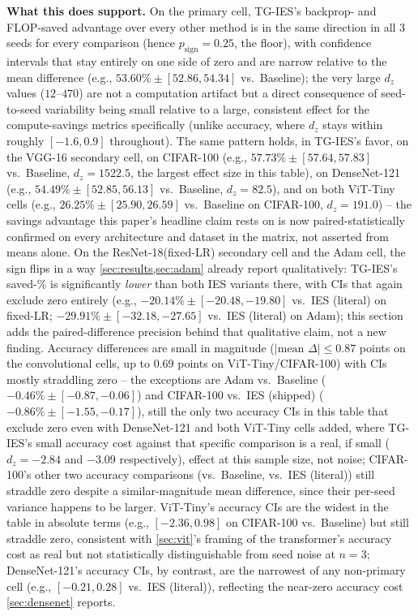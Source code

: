 \documentclass{article}
\theoremstyle{plain}
\theoremstyle{definition}
\theoremstyle{remark}
\begin{document}
\textbf{What this does support.} On the primary cell, TG-IES's backprop- and FLOP-saved advantage over every other method is in the same direction in all 3 seeds for every comparison (hence $p_{\mathrm{sign}}=0.25$, the floor), with confidence intervals that stay entirely on one side of zero and are narrow relative to the mean difference (e.g., $53.60\%\pm[52.86,54.34]$ vs.\ Baseline); the very large $d_z$ values ($12$--$470$) are not a computation artifact but a direct consequence of seed-to-seed variability being small relative to a large, consistent effect for the compute-savings metrics specifically (unlike accuracy, where $d_z$ stays within roughly $[-1.6,0.9]$ throughout). The same pattern holds, in TG-IES's favor, on the VGG-16 secondary cell, on CIFAR-100 (e.g., $57.73\%\pm[57.64,57.83]$ vs.\ Baseline, $d_z=1522.5$, the largest effect size in this table), on DenseNet-121 (e.g., $54.49\%\pm[52.85,56.13]$ vs.\ Baseline, $d_z=82.5$), and on both ViT-Tiny cells (e.g., $26.25\%\pm[25.90,26.59]$ vs.\ Baseline on CIFAR-100, $d_z=191.0$) -- the savings advantage this paper's headline claim rests on is now paired-statistically confirmed on every architecture and dataset in the matrix, not asserted from means alone. On the ResNet-18(fixed-LR) secondary cell and the Adam cell, the sign flips in a way \cref{sec:results,sec:adam} already report qualitatively: TG-IES's saved-\% is significantly \emph{lower} than both IES variants there, with CIs that again exclude zero entirely (e.g., $-20.14\%\pm[-20.48,-19.80]$ vs.\ IES (literal) on fixed-LR; $-29.91\%\pm[-32.18,-27.65]$ vs.\ IES (literal) on Adam); this section adds the paired-difference precision behind that qualitative claim, not a new finding. Accuracy differences are small in magnitude ($|\text{mean }\Delta|\le0.87$ points on the convolutional cells, up to $0.69$ points on ViT-Tiny/CIFAR-100) with CIs mostly straddling zero -- the exceptions are Adam vs.\ Baseline ($-0.46\%\pm[-0.87,-0.06]$) and CIFAR-100 vs.\ IES (shipped) ($-0.86\%\pm[-1.55,-0.17]$), still the only two accuracy CIs in this table that exclude zero even with DenseNet-121 and both ViT-Tiny cells added, where TG-IES's small accuracy cost against that specific comparison is a real, if small ($d_z=-2.84$ and $-3.09$ respectively), effect at this sample size, not noise; CIFAR-100's other two accuracy comparisons (vs.\ Baseline, vs.\ IES (literal)) still straddle zero despite a similar-magnitude mean difference, since their per-seed variance happens to be larger. ViT-Tiny's accuracy CIs are the widest in the table in absolute terms (e.g., $[-2.36,0.98]$ on CIFAR-100 vs.\ Baseline) but still straddle zero, consistent with \cref{sec:vit}'s framing of the transformer's accuracy cost as real but not statistically distinguishable from seed noise at $n=3$; DenseNet-121's accuracy CIs, by contrast, are the narrowest of any non-primary cell (e.g., $[-0.21,0.28]$ vs.\ IES (literal)), reflecting the near-zero accuracy cost \cref{sec:densenet} reports.
\end{document}
